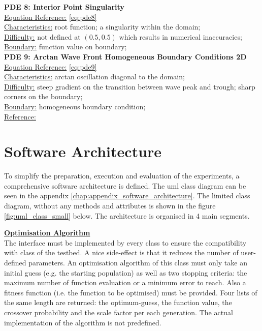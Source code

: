 \documentclass[./\jobname.tex]{subfiles}
\begin{document}
\textbf{PDE 8: Interior Point Singularity} \\
\underline{Equation Reference:} \eqref{eq:pde8} \\
\underline{Characteristics:} root function; a singularity within the domain; \\
\underline{Difficulty:} not defined at $(0.5, 0.5)$ which results in numerical inaccuracies; \\
\underline{Boundary:} function value on boundary; \\

\textbf{PDE 9: Arctan Wave Front Homogeneous Boundary Conditions 2D} \\
\underline{Equation Reference:} \eqref{eq:pde9} \\
\underline{Characteristics:} arctan oscillation diagonal to the domain;  \\
\underline{Difficulty:} steep gradient on the transition between wave peak and trough; sharp corners on the boundary; \\
\underline{Boundary:} homogeneous boundary condition; \\
\underline{Reference:} \cite{mitchell_nist_2018} \\


\section{Software Architecture}
\label{chap:software_architecutre}

To simplify the preparation, execution and evaluation of the experiments, a comprehensive software architecture is defined. The \gls{uml} class diagram can be seen in the appendix \ref{chap:appendix_software_architecture}. The limited class diagram, without any methods and attributes is shown in the figure \ref{fig:uml_class_small} below. The architecture is organised in 4 main segments. 

\large \underline{\textbf{Optimisation Algorithm}} \\
The  interface must be implemented by every  class to ensure the compatibility with  class of the testbed. A nice side-effect is that it reduces the number of user-defined parameters. An optimisation algorithm of this class must only take an initial guess (e.g. the starting population) as well as two stopping criteria: the maximum number of function evaluation or a minimum error to reach. Also a fitness function (i.e. the function to be optimised) must be provided. Four lists of the same length are returned: the optimum-guess, the function value, the crossover probability and the scale factor per each generation. The actual implementation of the algorithm is not predefined. 
\end{document}
